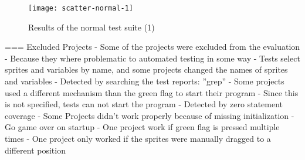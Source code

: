 \begin{figure}
    \centering
    \texttt{[image: scatter-normal-1]}
    \caption{Results of the normal test suite (1)}
    \label{fig:scatter_normal_1}
\end{figure}

=== Excluded Projects
- Some of the projects were excluded from the evaluation
- Because they where problematic to automated testing in some way
    - Tests select sprites and variables by name, and some projects changed the names of sprites and variables
        - Detected by searching the test reports: ''grep''
    - Some projects used a different mechanism than the green flag to start their program
        - Since this is not specified, tests can not start the program
        - Detected by zero statement coverage
    - Some Projects didn't work properly because of missing initialization
        - Go game over on startup
        - One project work if green flag is pressed multiple times
        - One project only worked if the sprites were manually dragged to a different position

